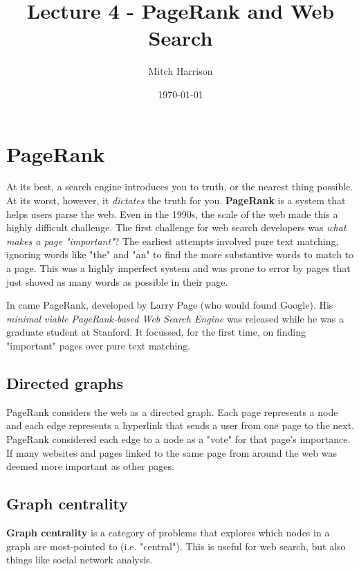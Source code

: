 \documentclass[titlepage, 12pt, leqno]{article}
\title{\Huge{Lecture 4 - PageRank and Web Search}}
\author{\large{Mitch Harrison}}
\date{\today}
\begin{document}
\setlength{\parskip}{1\baselineskip}
\setlength{\parindent}{15pt}
\maketitle
\tableofcontents
\newpage


\section{PageRank}

At its best, a search engine introduces you to truth, or the nearest thing 
possible. At its worst, however, it \textit{dictates} the truth for you. 
\textbf{PageRank} is a system that helps users parse the web. Even in the 1990s, 
the scale of the web made this a highly difficult challenge. The first challenge
for web search developers was \textit{what makes a page "important"}? The earliest
attempts involved pure text matching, ignoring words like "the" and "an" to find
the more substantive words to match to a page. This was a highly imperfect 
system and was prone to error by pages that just shoved as many words as possible
in their page. 

In came PageRank, developed by Larry Page (who would found Google). His 
\textit{minimal viable PageRank-based Web Search Engine} was released while he was
a graduate student at Stanford. It focussed, for the first time, on finding
"important" pages over pure text matching.

\subsection{Directed graphs}
PageRank considers the web as a directed graph. Each page represents a node and
each edge represents a hyperlink that sends a user from one page to the next.
PageRank considered each edge to a node as a "vote" for that page's importance. If
many websites and pages linked to the same page from around the web was deemed
more important as other pages.

\subsection{Graph centrality}

\begin{definition}
    \textbf{Graph centrality} is a category of problems that explores which nodes
    in a graph are most-pointed to (i.e. "central"). This is useful for web 
    search, but also things like social network analysis.
\end{definition}
\end{document}
